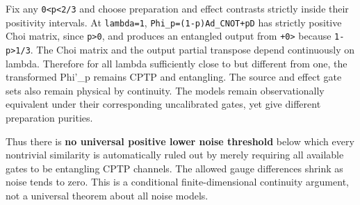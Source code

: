 \documentclass[
  10pt,
  a4paper,
]{article}
\begin{document}
Fix any \texttt{0\textless{}p\textless{}2/3} and choose preparation and effect contrasts strictly inside their positivity intervals. At \texttt{lambda=1}, \texttt{Phi\_p=(1-p)Ad\_CNOT+pD} has strictly positive Choi matrix, since \texttt{p\textgreater{}0}, and produces an entangled output from \texttt{\textbar{}+0\textgreater{}} because \texttt{1-p\textgreater{}1/3}. The Choi matrix and the output partial transpose depend continuously on lambda. Therefore for all lambda sufficiently close to but different from one, the transformed Phi'\_p remains CPTP and entangling. The source and effect gate sets also remain physical by continuity. The models remain observationally equivalent under their corresponding uncalibrated gates, yet give different preparation purities.

Thus there is \textbf{no universal positive lower noise threshold} below which every nontrivial similarity is automatically ruled out by merely requiring all available gates to be entangling CPTP channels. The allowed gauge differences shrink as noise tends to zero. This is a conditional finite-dimensional continuity argument, not a universal theorem about all noise models.
\end{document}
